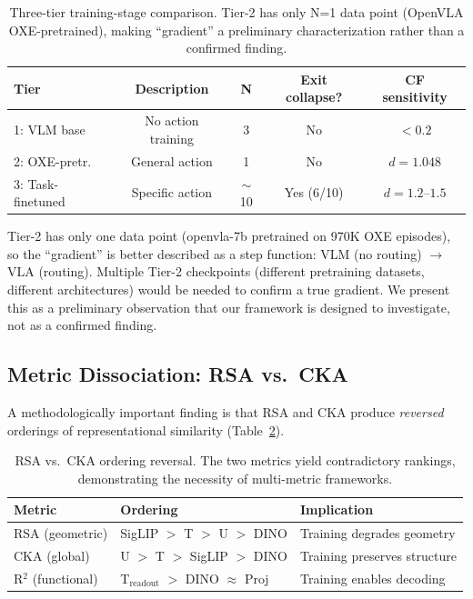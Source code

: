 \documentclass[letterpaper]{article}
\begin{document}
\begin{table}[t]
\centering
\caption{Three-tier training-stage comparison. Tier-2 has only N=1 data point (OpenVLA OXE-pretrained), making ``gradient'' a preliminary characterization rather than a confirmed finding.}
\label{tab:gradient}
\small
\setlength{\tabcolsep}{3pt}
\begin{tabular}{lcccc}
\toprule
\textbf{Tier} & \textbf{Description} & \textbf{N} & \textbf{Exit collapse?} & \textbf{CF sensitivity} \\
\midrule
1: VLM base & No action training & 3 & No & $<0.2$ \\
2: OXE-pretr. & General action & 1 & No & $d = 1.048$ \\
3: Task-finetuned & Specific action & $\sim$10 & Yes (6/10) & $d = 1.2$--$1.5$ \\
\bottomrule
\end{tabular}
\end{table}

Tier-2 has only one data point (openvla-7b pretrained on 970K OXE episodes), so the ``gradient'' is better described as a step function: VLM (no routing) $\rightarrow$ VLA (routing).
Multiple Tier-2 checkpoints (different pretraining datasets, different architectures) would be needed to confirm a true gradient.
We present this as a preliminary observation that our framework is designed to investigate, not as a confirmed finding.

\subsection{Metric Dissociation: RSA vs.\ CKA}
\label{sec:metric}

A methodologically important finding is that RSA and CKA produce \emph{reversed} orderings of representational similarity (Table~\ref{tab:metric}).

\begin{table}[t]
\centering
\caption{RSA vs.\ CKA ordering reversal. The two metrics yield contradictory rankings, demonstrating the necessity of multi-metric frameworks.}
\label{tab:metric}
\small
\begin{tabular}{lll}
\toprule
\textbf{Metric} & \textbf{Ordering} & \textbf{Implication} \\
\midrule
RSA (geometric) & SigLIP $>$ T $>$ U $>$ DINO & Training degrades geometry \\
CKA (global) & U $>$ T $>$ SigLIP $>$ DINO & Training preserves structure \\
R$^2$ (functional) & T$_{\text{readout}}$ $>$ DINO $\approx$ Proj & Training enables decoding \\
\bottomrule
\end{tabular}
\end{table}
\end{document}
